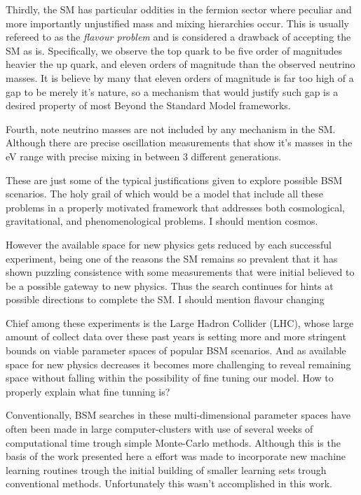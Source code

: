 Thirdly, the SM has particular oddities in the fermion sector where peculiar and more importantly unjustified mass and mixing hierarchies occur. This is usually refereed to as the \textit{flavour problem} and is considered a drawback of accepting the SM as is. Specifically, we observe the top quark to be five order of magnitudes heavier the up quark, and eleven orders of magnitude than the observed neutrino masses. It is believe by many that eleven orders of magnitude is far too high of a gap to be merely it's nature, so a mechanism that would justify such gap is a desired property of most Beyond the Standard Model frameworks. 

Fourth, note neutrino masses are not included by any mechanism in the 
SM. Although there are precise oscillation measurements that show it's masses in the eV range with precise mixing in between 3 different generations. 

These are just some of the typical justifications given to explore possible BSM scenarios. The holy grail of which would be a model that include all these problems in a properly motivated framework that addresses both cosmological, gravitational, and phenomenological problems. {\color{blue} I should mention cosmos}. 

However the available space for new physics gets reduced by each successful experiment, being one of the reasons the SM remains so prevalent that it has shown puzzling consistence with some measurements that were initial believed to be a possible gateway to new physics. Thus the search continues for hints at possible directions to complete the SM. {\color{blue} I should mention flavour changing }  

Chief among these experiments is the Large Hadron Collider (LHC), whose large amount of collect data over these past years is setting more and more stringent bounds on viable parameter spaces of popular BSM scenarios. And as available space for new physics decreases it becomes more challenging to reveal remaining space without falling within the possibility of fine tuning our model.  
%
{\color{blue} How to properly explain what fine tunning is?}

Conventionally, BSM searches in these multi-dimensional parameter spaces have often been made in large computer-clusters with use of several weeks of computational time trough simple Monte-Carlo methods. Although this is the basis of the work presented here a effort was made to incorporate new machine learning routines trough the initial building of smaller learning sets trough conventional methods. Unfortunately this wasn't accomplished in this work.

